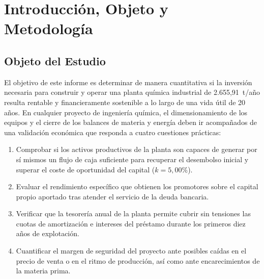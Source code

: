 \documentclass[a4paper,11pt]{report}
\begin{document}
\tableofcontents
\newpage

\chapter{Introducción, Objeto y Metodología}

\section{Objeto del Estudio}
El objetivo de este informe es determinar de manera cuantitativa si la inversión necesaria para construir y operar una planta química industrial de 2.655,91~t/año resulta rentable y financieramente sostenible a lo largo de una vida útil de 20 años. En cualquier proyecto de ingeniería química, el dimensionamiento de los equipos y el cierre de los balances de materia y energía deben ir acompañados de una validación económica que responda a cuatro cuestiones prácticas:
\begin{enumerate}[label=\alph*)]
    \item Comprobar si los activos productivos de la planta son capaces de generar por sí mismos un flujo de caja suficiente para recuperar el desembolso inicial y superar el coste de oportunidad del capital ($k = 5,00\%$).
    \item Evaluar el rendimiento específico que obtienen los promotores sobre el capital propio aportado tras atender el servicio de la deuda bancaria.
    \item Verificar que la tesorería anual de la planta permite cubrir sin tensiones las cuotas de amortización e intereses del préstamo durante los primeros diez años de explotación.
    \item Cuantificar el margen de seguridad del proyecto ante posibles caídas en el precio de venta o en el ritmo de producción, así como ante encarecimientos de la materia prima.
\end{enumerate}
\end{document}
